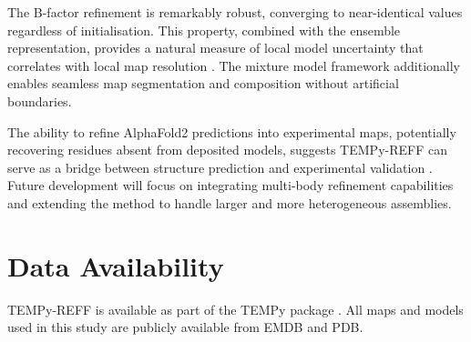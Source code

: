 \documentclass[11pt]{article}
\begin{document}
The B-factor refinement is remarkably robust, converging to near-identical values regardless of initialisation. This property, combined with the ensemble representation, provides a natural measure of local model uncertainty that correlates with local map resolution \citep{cardone2013}. The mixture model framework additionally enables seamless map segmentation and composition without artificial boundaries.

The ability to refine AlphaFold2 predictions into experimental maps, potentially recovering residues absent from deposited models, suggests TEMPy-REFF can serve as a bridge between structure prediction and experimental validation \citep{jumper2021,tunyasuvunakool2021,evans2022}. Future development will focus on integrating multi-body refinement capabilities and extending the method to handle larger and more heterogeneous assemblies.

\section{Data Availability}

TEMPy-REFF is available as part of the TEMPy package \citep{farabella2015}. All maps and models used in this study are publicly available from EMDB and PDB.



\end{document}
